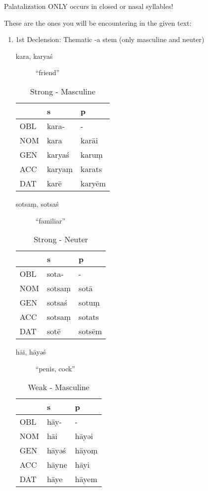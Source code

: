 \documentclass[11pt,a4paper]{article}
\begin{document}
Palatalization ONLY occurs in closed or nasal syllables!

These are the ones you will be encountering in the given text:

\begin{enumerate}
\item 1st Declension: Thematic -a stem (only masculine and neuter)
\label{sec:orgdd18b3e}
\begin{description}
\item[{kara, karyaś}] ``friend''
\end{description}
\begin{table}[htbp]
\caption{Strong - Masculine}
\centering
\begin{tabular}{lll}
 & s & p\\
\hline
OBL & kara- & -\\
NOM & kara & karāi\\
GEN & karyaś & karuṃ\\
ACC & karyaṃ & karats\\
DAT & karē & karyēm\\
\end{tabular}
\end{table}

\begin{description}
\item[{sotsaṃ, sotsaś}] ``familiar''
\end{description}
\begin{table}[htbp]
\caption{Strong - Neuter}
\centering
\begin{tabular}{lll}
 & s & p\\
\hline
OBL & sota- & -\\
NOM & sotsaṃ & sotā\\
GEN & sotsaś & sotuṃ\\
ACC & sotsaṃ & sotats\\
DAT & sotē & sotsēm\\
\end{tabular}
\end{table}

\begin{description}
\item[{hāi, hāyəś}] ``penis, cock''
\end{description}
\begin{table}[htbp]
\caption{Weak - Masculine}
\centering
\begin{tabular}{lll}
 & s & p\\
\hline
OBL & hāy- & -\\
NOM & hāi & hāyəi\\
GEN & hāyəś & hāyoṃ\\
ACC & hāyne & hāyi\\
DAT & hāye & hāyem\\
\end{tabular}
\end{table}


\end{enumerate}
\end{document}
